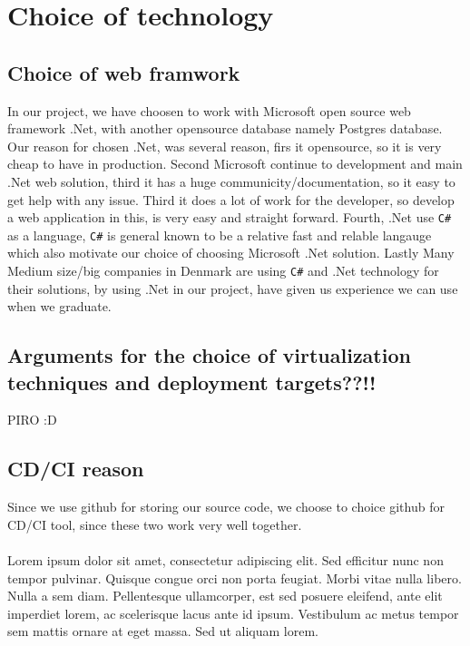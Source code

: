 
\section{Choice of technology}

\subsection{Choice of web framwork}
In our project, we have choosen to work with Microsoft open source web framework .Net, with another opensource database namely Postgres database. Our reason for chosen .Net, was several reason, firs it opensource, so it is very cheap to have in production. Second Microsoft continue to development and main .Net web solution, third it has a huge communicity/documentation, so it easy to get help with any issue. Third it does a lot of work for the developer, so develop a web application in this, is very easy and straight forward. Fourth, .Net use \texttt{C\#} as a language, \texttt{C\#} is general known to be a relative fast and relable langauge which also motivate our choice of choosing Microsoft .Net solution. Lastly Many Medium size/big companies in Denmark are using \texttt{C\#} and .Net technology for their solutions, by using .Net in our project, have given us experience we can use when we graduate. 


\subsection{Arguments for the choice of virtualization techniques and deployment targets??!!}
PIRO :D 

\subsection{CD/CI reason}
Since we use github for storing our source code, we choose to choice github for CD/CI tool, since these two work very well together. 



\paragraph{}  Lorem ipsum dolor sit amet, consectetur adipiscing elit. Sed efficitur nunc non tempor pulvinar. Quisque congue orci non porta feugiat. Morbi vitae nulla libero. Nulla a sem diam. Pellentesque ullamcorper, est sed posuere eleifend, ante elit imperdiet lorem, ac scelerisque lacus ante id ipsum. Vestibulum ac metus tempor sem mattis ornare at eget massa. Sed ut aliquam lorem. 
